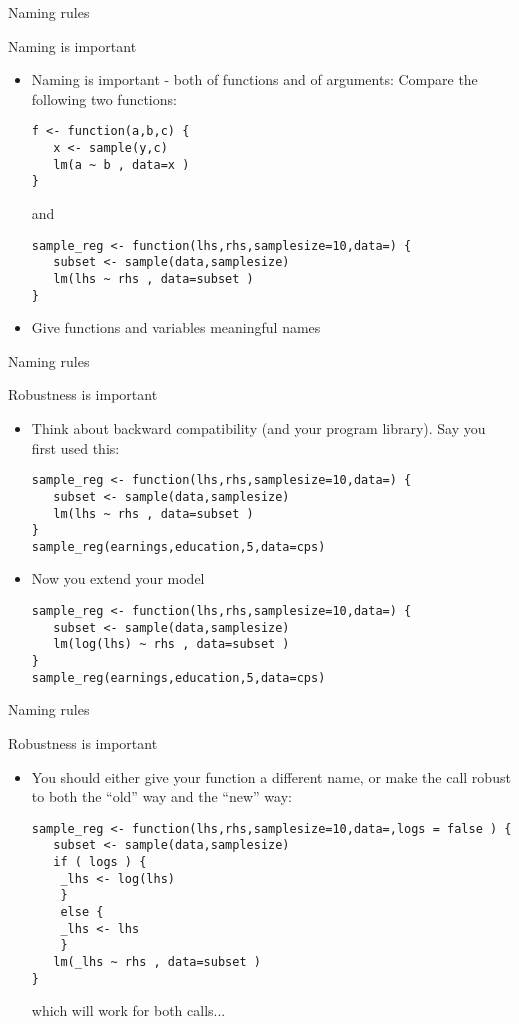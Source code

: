 \documentclass[xcolor=table,compress]{beamer}
\begin{document}
\begin{frame}[fragile]{Naming rules}
\begin{block}{Naming is important}
\begin{itemize}
\item Naming is important - both of functions and of arguments: Compare the following two functions:
\begin{lstlisting}
f <- function(a,b,c) {
   x <- sample(y,c)
   lm(a ~ b , data=x )
}
\end{lstlisting}
and
\begin{lstlisting}
sample_reg <- function(lhs,rhs,samplesize=10,data=) {
   subset <- sample(data,samplesize)
   lm(lhs ~ rhs , data=subset )
}
\end{lstlisting}
\item Give functions and variables meaningful names
\end{itemize}
\end{block}
\end{frame}


\begin{frame}[fragile]{Naming rules}
\begin{block}{Robustness is important}
\begin{itemize}[<+->]
\item Think about backward compatibility (and your program library). Say you first used this:
\begin{lstlisting}
sample_reg <- function(lhs,rhs,samplesize=10,data=) {
   subset <- sample(data,samplesize)
   lm(lhs ~ rhs , data=subset )
}
sample_reg(earnings,education,5,data=cps)
\end{lstlisting}
\item Now you extend your model
\color{red}
\begin{lstlisting}
sample_reg <- function(lhs,rhs,samplesize=10,data=) {
   subset <- sample(data,samplesize)
   lm(log(lhs) ~ rhs , data=subset )
}
sample_reg(earnings,education,5,data=cps)
\end{lstlisting}
\end{itemize}
\end{block}
\end{frame}


\begin{frame}[fragile]{Naming rules}
\begin{block}{Robustness is important}
\begin{itemize}
\item You should either give your function a different name, or make the call robust to both the ``old'' way and the ``new'' way:\color{blue}
\begin{lstlisting}
sample_reg <- function(lhs,rhs,samplesize=10,data=,logs = false ) {
   subset <- sample(data,samplesize)
   if ( logs ) {
   	_lhs <- log(lhs)
   	}
   	else {
   	_lhs <- lhs
   	}
   lm(_lhs ~ rhs , data=subset )
}
\end{lstlisting}\color{black}
which will work for both calls... 
\end{itemize}
\end{block}
\end{frame}
\end{document}
